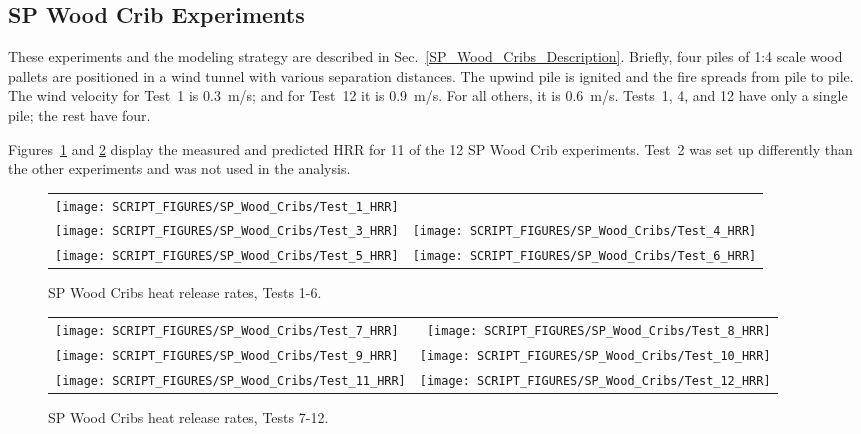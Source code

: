 \clearpage


\subsection{SP Wood Crib Experiments}

These experiments and the modeling strategy are described in Sec.~\ref{SP_Wood_Cribs_Description}. Briefly, four piles of 1:4 scale wood pallets are positioned in a wind tunnel with various separation distances. The upwind pile is ignited and the fire spreads from pile to pile. The wind velocity for Test~1 is 0.3~m/s; and for Test~12 it is 0.9~m/s. For all others, it is 0.6~m/s. Tests~1, 4, and 12 have only a single pile; the rest have four.

Figures~\ref{SP_Wood_Cribs_HRR_1} and \ref{SP_Wood_Cribs_HRR_2} display the measured and predicted HRR for 11 of the 12 SP Wood Crib experiments. Test~2 was set up differently than the other experiments and was not used in the analysis.

\begin{figure}[!ht]
\begin{tabular*}{\textwidth}{l@{\extracolsep{\fill}}r}
\texttt{[image: SCRIPT\_FIGURES/SP\_Wood\_Cribs/Test\_1\_HRR]} &
 \\
\texttt{[image: SCRIPT\_FIGURES/SP\_Wood\_Cribs/Test\_3\_HRR]} &
\texttt{[image: SCRIPT\_FIGURES/SP\_Wood\_Cribs/Test\_4\_HRR]} \\
\texttt{[image: SCRIPT\_FIGURES/SP\_Wood\_Cribs/Test\_5\_HRR]} &
\texttt{[image: SCRIPT\_FIGURES/SP\_Wood\_Cribs/Test\_6\_HRR]}
\end{tabular*}
\caption[SP Wood Cribs heat release rates, Tests 1-6]{SP Wood Cribs heat release rates, Tests 1-6.}
\label{SP_Wood_Cribs_HRR_1}
\end{figure}

\begin{figure}[p]
\begin{tabular*}{\textwidth}{l@{\extracolsep{\fill}}r}
\texttt{[image: SCRIPT\_FIGURES/SP\_Wood\_Cribs/Test\_7\_HRR]} &
\texttt{[image: SCRIPT\_FIGURES/SP\_Wood\_Cribs/Test\_8\_HRR]} \\
\texttt{[image: SCRIPT\_FIGURES/SP\_Wood\_Cribs/Test\_9\_HRR]} &
\texttt{[image: SCRIPT\_FIGURES/SP\_Wood\_Cribs/Test\_10\_HRR]} \\
\texttt{[image: SCRIPT\_FIGURES/SP\_Wood\_Cribs/Test\_11\_HRR]} &
\texttt{[image: SCRIPT\_FIGURES/SP\_Wood\_Cribs/Test\_12\_HRR]}
\end{tabular*}
\caption[SP Wood Cribs heat release rates, Tests 7-12]{SP Wood Cribs heat release rates, Tests 7-12.}
\label{SP_Wood_Cribs_HRR_2}
\end{figure}


